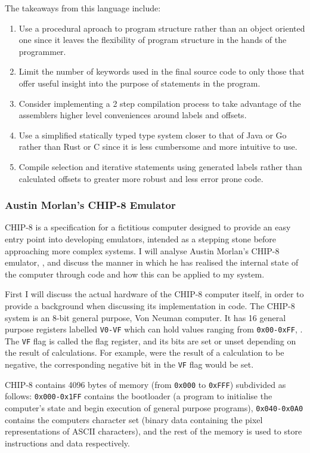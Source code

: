 The takeaways from this language include:
\begin{enumerate}
    \item Use a procedural aproach to program structure rather than an object oriented one since it leaves the flexibility of program structure in the hands of the programmer.
    \item Limit the number of keywords used in the final source code to only those that offer useful insight into the purpose of statements in the program.
    \item Consider implementing a 2 step compilation process to take advantage of the assemblers higher level conveniences around labels and offsets.
    \item Use a simplified statically typed type system closer to that of Java or Go rather than Rust or C since it is less cumbersome and more intuitive to use.
    \item Compile selection and iterative statements using generated labels rather than calculated offsets to greater more robust and less error prone code.
\end{enumerate}

\subsubsection{Austin Morlan's CHIP-8 Emulator}
CHIP-8 is a specification for a fictitious computer designed to provide an easy entry point into developing emulators, intended as a stepping stone before approaching more complex systems. I will analyse Austin Morlan's CHIP-8 emulator, \textcite{CHIP-8}, and discuss the manner in which he has realised the internal state of the computer through code and how this can be applied to my system.

First I will discuss the actual hardware of the CHIP-8 computer itself, in order to provide a background when discussing its implementation in code. The CHIP-8 system is an 8-bit general purpose, Von Neuman computer. It has 16 general purpose registers labelled \texttt{V0-VF} which can hold values ranging from \texttt{0x00-0xFF}, \textcite{CHIP-8-blog}. The \texttt{VF} flag is called the flag register, and its bits are set or unset depending on the result of calculations. For example, were the result of a calculation to be negative, the corresponding negative bit in the \texttt{VF} flag would be set.

CHIP-8 contains 4096 bytes of memory (from \texttt{0x000} to \texttt{0xFFF}) subdivided as follows: \texttt{0x000-0x1FF} contains the bootloader (a program to initialise the computer's state and begin execution of general purpose programs), \texttt{0x040-0x0A0} contains the computers character set (binary data containing the pixel representations of ASCII characters), and the rest of the memory is used to store instructions and data respectively.

